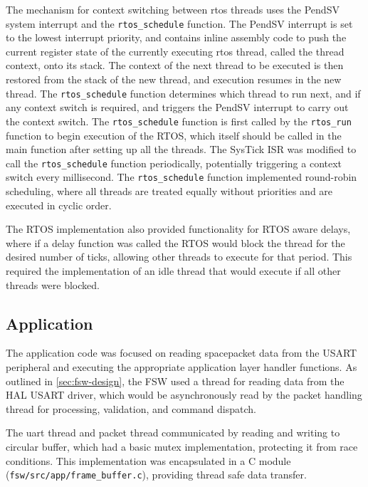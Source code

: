 \documentclass[../report.tex]{subfiles}
\begin{document}
The mechanism for context switching between rtos threads uses the PendSV system
interrupt and the \lstinline|rtos_schedule| function. The PendSV interrupt is
set to the lowest interrupt priority, and contains inline assembly code to push
the current register state of the currently executing rtos thread, called the
thread context, onto its stack. The context of the next thread to be executed
is then restored from the stack of the new thread, and execution resumes in the
new thread. The \lstinline|rtos_schedule| function determines which thread to
run next, and if any context switch is required, and triggers the PendSV
interrupt to carry out the context switch. The \lstinline|rtos_schedule|
function is first called by the \lstinline|rtos_run| function to begin
execution of the RTOS, which itself should be called in the main function after
setting up all the threads. The SysTick ISR was modified to call the
\lstinline|rtos_schedule| function periodically, potentially triggering a
context switch every millisecond. The \lstinline|rtos_schedule| function
implemented round-robin scheduling, where all threads are treated equally
without priorities and are executed in cyclic order.

The RTOS implementation also provided functionality for RTOS aware delays,
where if a delay function was called the RTOS would block the thread for the
desired number of ticks, allowing other threads to execute for that period.
This required the implementation of an idle thread that would execute if all
other threads were blocked.

\subsection{Application}

The application code was focused on reading spacepacket data from the USART
peripheral and executing the appropriate application layer handler functions.
As outlined in \autoref{sec:fsw-design}, the FSW used a thread for reading data
from the HAL USART driver, which would be asynchronously read by the packet
handling thread for processing, validation, and command dispatch.

The uart thread and packet thread communicated by reading and writing to
circular buffer, which had a basic mutex implementation, protecting it from
race conditions. This implementation was encapsulated in a C module
(\lstinline|fsw/src/app/frame_buffer.c|), providing thread safe data transfer.
\end{document}
